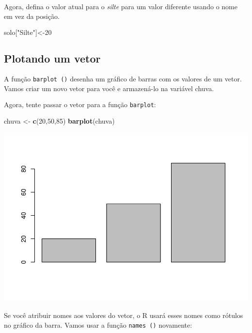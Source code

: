 \documentclass[]{book}
\newenvironment{Shaded}{\begin{snugshade}}{\end{snugshade}}
\newcommand{\DecValTok}[1]{\textcolor[rgb]{0.00,0.00,0.81}{#1}}
\newcommand{\KeywordTok}[1]{\textcolor[rgb]{0.13,0.29,0.53}{\textbf{#1}}}
\newcommand{\NormalTok}[1]{#1}
\newcommand{\StringTok}[1]{\textcolor[rgb]{0.31,0.60,0.02}{#1}}
\begin{document}
Agora, defina o valor atual para o \emph{silte} para um valor diferente usando o nome em vez da posição.

\begin{Shaded}
\begin{Highlighting}[]
\NormalTok{solo[}\StringTok{"Silte"}\NormalTok{]<-}\DecValTok{20}
\end{Highlighting}
\end{Shaded}

\hypertarget{plotando-um-vetor}{%
\subsection{Plotando um vetor}\label{plotando-um-vetor}}

A função \texttt{barplot\ ()} desenha um gráfico de barras com os valores de um vetor. Vamos criar um novo vetor para você e armazená-lo na variável chuva.

Agora, tente passar o vetor para a função \texttt{barplot}:

\begin{Shaded}
\begin{Highlighting}[]
\NormalTok{chuva <-}\StringTok{ }\KeywordTok{c}\NormalTok{(}\DecValTok{20}\NormalTok{,}\DecValTok{50}\NormalTok{,}\DecValTok{85}\NormalTok{)}
\KeywordTok{barplot}\NormalTok{(chuva)}
\end{Highlighting}
\end{Shaded}

\includegraphics{TudodoR_files/figure-latex/unnamed-chunk-32-1.pdf}

Se você atribuir nomes aos valores do vetor, o R usará esses nomes como rótulos no gráfico da barra. Vamos usar a função \texttt{names\ ()} novamente:
\end{document}
